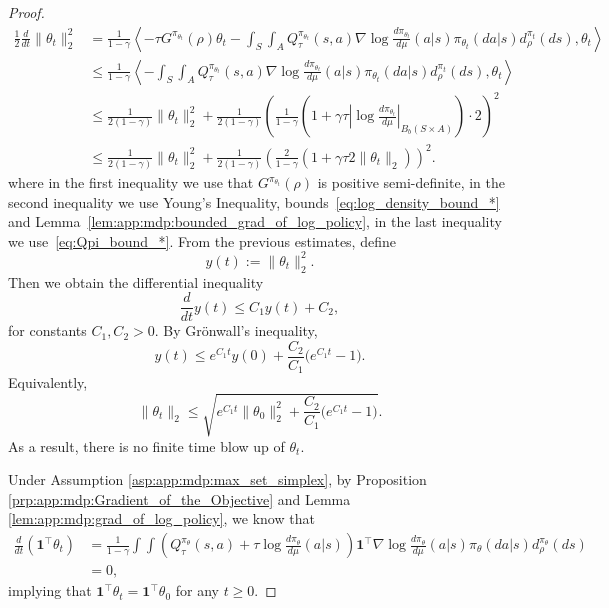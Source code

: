 \documentclass{amsart}
\theoremstyle{definition}
\begin{document}
\begin{proof}
\begin{align*}
\frac{1}{2}\frac{d}{d t}\|\theta_t\|_2^2
& = \frac{1}{1-\gamma}\left \langle -\tau G^{\pi_{\theta_t}}(\rho)  \theta_t -  \int_{S} \int_{A} Q^{\pi_{\theta_t}}_{\tau}(s,a)\nabla\log\frac{d \pi_{\theta_t}}{d \mu} (a|s)\pi_{\theta_t}(da|s)d_\rho^{\pi_t}(ds), \theta_t\right \rangle \\
& \leq \frac{1}{1-\gamma}\left \langle  -  \int_{S} \int_{A} Q^{\pi_{\theta_t}}_{\tau}(s,a)\nabla\log\frac{d \pi_{\theta_t}}{d \mu} (a|s)\pi_{\theta_t}(da|s)d_\rho^{\pi_t}(ds), \theta_t\right \rangle \\
& \leq \frac{1}{2(1-\gamma)} \|\theta_t\|_2^2 + \frac{1}{2(1-\gamma)}\left(\frac{1}{1-\gamma} \left(1+\gamma\tau \left|\log \frac{d\pi_{\theta_t}}{d\mu}\right|_{B_b(S \times A)}\right) \cdot 2\right)^2\\
& \leq \frac{1}{2(1-\gamma)} \|\theta_t\|_2^2 + \frac{1}{2(1-\gamma)}\left(\frac{2}{1-\gamma} \left(1+\gamma\tau 2\|\theta_t\|_2 \right)\right)^2.
\end{align*}
where in the first inequality we use that  $G^{\pi_{\theta_t}}(\rho)$ is positive semi-definite, in the second inequality we use Young's Inequality, bounds~\eqref{eq:log_density_bound_*} and Lemma~\ref{lem:app:mdp:bounded_grad_of_log_policy}, in the last inequality we use~\eqref{eq:Qpi_bound_*}. From the previous estimates, define
\[
y(t) := \|\theta_t\|^2_2 .
\]
Then we obtain the differential inequality
\[
\frac{d}{dt} y(t) \le C_1 y(t) + C_2 ,
\]
for constants $C_1, C_2 > 0$. By Grönwall’s inequality,
\[
y(t) \le e^{C_1 t} y(0) + \frac{C_2}{C_1}\big(e^{C_1 t} - 1\big).
\]
Equivalently,
\[
\|\theta_t\|_2 \le \sqrt{ e^{C_1 t}\|\theta_0\|^2_2 + \frac{C_2}{C_1}\big(e^{C_1 t} - 1\big) }.
\] 
As a result, there is no finite time blow up of $\theta_t$. 

Under Assumption \ref{asp:app:mdp:max_set_simplex}, by Proposition \ref{prp:app:mdp:Gradient_of_the_Objective} and Lemma \ref{lem:app:mdp:grad_of_log_policy}, we know that
\begin{align*}
\frac{d}{d t}\left(\mathbf{1}^{\top} \theta_t\right) &= \frac{1}{1-\gamma}\int\int \left(Q^{\pi_\theta}_\tau(s,a) + \tau \log \frac{d \pi_{\theta}}{d \mu}(a|s)\right) \mathbf{1}^\top\nabla \log \frac{d\pi_\theta}{d \mu}(a| s)\pi_{\theta}(da|s)d_\rho^{\pi_{\theta}}(ds)\\
& = 0,
\end{align*}
implying that $\mathbf{1}^\top \theta_t = \mathbf{1}^\top \theta_0$ for any $t \geq 0$.


\end{proof}
\end{document}
